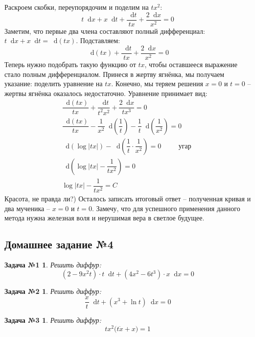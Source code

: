 \documentclass[a4paper,12pt]{article}
\newtheorem*{task1}{Задача №1}
\newtheorem*{task2}{Задача №2}
\newtheorem*{task3}{Задача №3}
\renewcommand*\d{\mathop{}\!\mathrm{d}}
\newcommand{\dx}{\dot{x}}
\begin{document}
Раскроем скобки, переупорядочим и поделим на $tx^2$:
\[t\d x + x\d t + \dfrac{\d t}{tx} + \dfrac{2\d x}{x^2} = 0\]
Заметим, что первые два члена составляют полный дифференциал: $t\d x + x\d t = \d(tx)$. Подставляем:
\[\d(tx) + \dfrac{\d t}{tx} + \dfrac{2\d x}{x^2} = 0\]
Теперь нужно подобрать такую функцию от $tx$, чтобы оставшееся выражение стало полным дифференциалом. Принеся в жертву ягнёнка, мы получаем указание: поделить уравнение на $tx$. Конечно, мы теряем решения $x = 0$ и $t = 0$ -- жертвы ягнёнка оказалось недостаточно. Уравнение принимает вид:
\begin{gather*}
\dfrac{\d(tx)}{tx} + \dfrac{\d t}{t^2x^2} + \dfrac{2\d x}{tx^3} = 0\\
\dfrac{\d(tx)}{tx} - \dfrac{1}{x^2}\d\left(\dfrac{1}{t}\right) - \dfrac{1}{t}\d\left(\dfrac{1}{x^2}\right) = 0\\
\d(\log|tx|) - \d\left(\dfrac{1}{t} \cdot \dfrac{1}{x^2}\right) = 0 \ \ \ \ \ \ \ \ \ \ \textit{ угар }\\
\d\left(\log|tx| - \dfrac{1}{tx^2}\right) = 0\\
\log|tx| - \dfrac{1}{tx^2} = C
\end{gather*}
Красота, не правда ли?) Осталось записать итоговый ответ -- полученная кривая и два мученика -- $x = 0$ и $t = 0$. Замечу, что для успешного применения данного метода нужна железная воля и нерушимая вера в светлое будущее.

\subsection{Домашнее задание №4}

\begin{task1}
	Решить диффур:
	\[(2 - 9x^2t) \cdot t\d t + (4x^2 - 6t^3)\cdot x \d x = 0\]
\end{task1}
%

\begin{task2}
	Решить диффур:
	\[\dfrac{x}{t}\d t + (x^3 + \ln t)\d x = 0\]
\end{task2}
%

\begin{task3}
	Решить диффур:
	\[tx^2\big(t\dx + x\big) = 1\]
\end{task3}
%	
\end{document}
